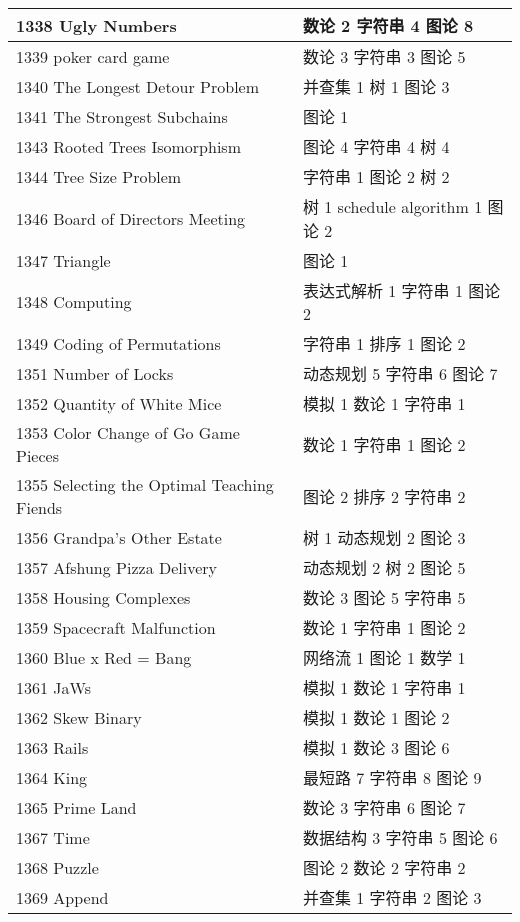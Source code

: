 \begin{longtable}{| p{} | p{} |}
 1338 Ugly Numbers  & 数论 2 字符串 4 图论 8 \\ \hline
 1339 poker card game  & 数论 3 字符串 3 图论 5 \\ \hline
 1340 The Longest Detour Problem  & 并查集 1 树 1 图论 3 \\ \hline
 1341 The Strongest Subchains  & 图论 1 \\ \hline
 1343 Rooted Trees Isomorphism  & 图论 4 字符串 4 树 4 \\ \hline
 1344 Tree Size Problem  & 字符串 1 图论 2 树 2 \\ \hline
 1346 Board of Directors Meeting  & 树 1 schedule algorithm 1 图论 2 \\ \hline
 1347 Triangle  & 图论 1 \\ \hline
 1348 Computing  & 表达式解析 1 字符串 1 图论 2 \\ \hline
 1349 Coding of Permutations  & 字符串 1 排序 1 图论 2 \\ \hline
 1351 Number of Locks  & 动态规划 5 字符串 6 图论 7 \\ \hline
 1352 Quantity of White Mice  & 模拟 1 数论 1 字符串 1 \\ \hline
 1353 Color Change of Go Game Pieces  & 数论 1 字符串 1 图论 2 \\ \hline
 1355 Selecting the Optimal Teaching Fiends  & 图论 2 排序 2 字符串 2 \\ \hline
 1356 Grandpa's Other Estate  & 树 1 动态规划 2 图论 3 \\ \hline
 1357 Afshung Pizza Delivery  & 动态规划 2 树 2 图论 5 \\ \hline
 1358 Housing Complexes  & 数论 3 图论 5 字符串 5 \\ \hline
 1359 Spacecraft Malfunction  & 数论 1 字符串 1 图论 2 \\ \hline
 1360 Blue x Red = Bang  & 网络流 1 图论 1 数学 1 \\ \hline
 1361 JaWs  & 模拟 1 数论 1 字符串 1 \\ \hline
 1362 Skew Binary  & 模拟 1 数论 1 图论 2 \\ \hline
 1363 Rails  & 模拟 1 数论 3 图论 6 \\ \hline
 1364 King  & 最短路 7 字符串 8 图论 9 \\ \hline
 1365 Prime Land  & 数论 3 字符串 6 图论 7 \\ \hline
 1367 Time  & 数据结构 3 字符串 5 图论 6 \\ \hline
 1368 Puzzle  & 图论 2 数论 2 字符串 2 \\ \hline
 1369 Append  & 并查集 1 字符串 2 图论 3 \\ \hline

\end{longtable}
